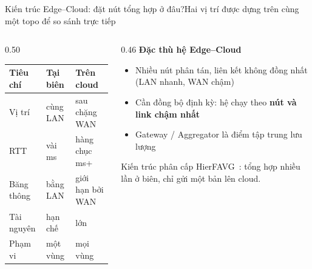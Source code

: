 \documentclass[aspectratio=169,10pt]{beamer}
\begin{document}
\begin{frame}{Kiến trúc Edge--Cloud: đặt nút tổng hợp ở đâu?}{Hai vị trí được dựng trên cùng một topo để so sánh trực tiếp}
  \begin{columns}[T]
    \begin{column}{0.50\textwidth}
      \small
      \begin{tabular}{l l l}
        \toprule
        \textbf{Tiêu chí} & \textbf{Tại biên} & \textbf{Trên cloud} \\
        \midrule
        Vị trí & cùng LAN & sau chặng WAN \\
        RTT & vài ms & hàng chục ms+ \\
        Băng thông & bằng LAN & giới hạn bởi WAN \\
        Tài nguyên & hạn chế & lớn \\
        Phạm vi & một vùng & mọi vùng \\
        \bottomrule
      \end{tabular}
    \end{column}
    \begin{column}{0.46\textwidth}
      \textbf{Đặc thù hệ Edge--Cloud}
      \begin{itemize}
        \item Nhiều nút phân tán, liên kết không đồng nhất (LAN nhanh, WAN chậm)
        \item Cần đồng bộ định kỳ: hệ chạy theo \textbf{nút và link chậm nhất}
        \item Gateway / Aggregator là điểm tập trung lưu lượng
      \end{itemize}
      \vspace{4pt}
      \scriptsize Kiến trúc phân cấp HierFAVG~\cite{liu2020hierfavg}: tổng hợp nhiều lần ở biên, chỉ gửi một bản lên cloud.
    \end{column}
  \end{columns}
\end{frame}
\end{document}
